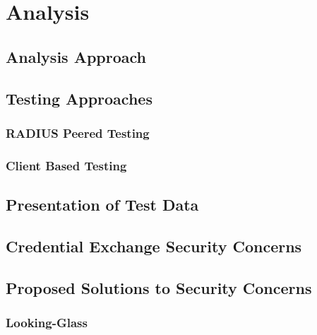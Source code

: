 
\section{Analysis}
\subsection{Analysis Approach}

\subsection{Testing Approaches}

\subsubsection{RADIUS Peered Testing}

\subsubsection{Client Based Testing}


\subsection{Presentation of Test Data}


\subsection{Credential Exchange Security Concerns}

\subsection{Proposed Solutions to Security Concerns}
\subsubsection{Looking-Glass}




